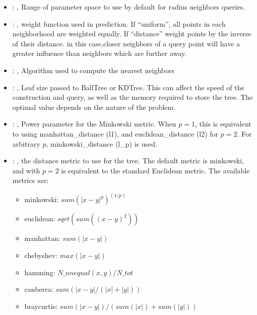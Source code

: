 \begin{itemize}
    \item {}: , 
      Range of parameter space to use by default for radius neighbors queries.

    \item {}: , 
      weight function used in prediction. If ``uniform'', all points in each neighborhood
      are weighted equally. If ``distance'' weight points by the inverse of their distance. in this
      case,closer neighbors of a query point will have a greater influence than neighbors which are
      further away.

    \item {}: , 
      Algorithm used to compute the nearest neighbors

    \item {}: , 
      Leaf size passed to BallTree or KDTree. This can affect the speed of the construction
      and query, as well as the memory required to store the tree. The optimal value depends on the
      nature of the problem.

    \item {}: , 
      Power parameter for the Minkowski metric. When $p = 1$, this is equivalent to using
      manhattan\_distance (l1), and euclidean\_distance (l2) for $p = 2$. For arbitrary $p$,
      minkowski\_distance                                                  (l\_p) is used.

    \item {}: , 
      the distance metric to use for the tree. The default metric is minkowski, and with
      $p=2$ is equivalent to the standard Euclidean metric.
      The available metrics are:                                                  \begin{itemize}
      \item minkowski: $sum(|x - y|^p)^(1/p)$
      \item euclidean: $sqrt(sum((x - y)^2))$
      \item manhattan: $sum(|x - y|)$                                                    \item
      chebyshev: $max(|x - y|)$                                                    \item hamming:
      $N\_unequal(x, y) / N\_tot$                                                    \item canberra:
      $sum(|x - y| / (|x| + |y|))$                                                    \item
      braycurtis: $sum(|x - y|) / (sum(|x|) + sum(|y|))$
      \end{itemize}


\end{itemize}
